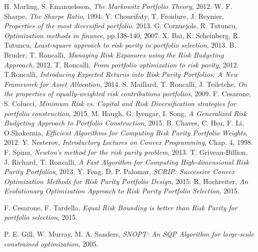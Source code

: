  H. Marling, S. Emanuelsson,
  \emph{The Markowitz Portfolio Theory},
  2012.
  W. F. Sharpe,
  \emph{The Sharpe Ratio},
  1994.
  Y. Choueifaty, T. Froidure, J. Reynier,
  \emph{Properties of the most diversified portfolio},
  2013. 
  G. Cornuejols, R. Tutuncu,
  \emph{Optimization methods in finance}, pp.138-140,
   2007.
  X. Bai, K. Scheinberg, R. Tutuncu,
  \emph{Least-square approach to risk parity in portfolio selection},
  2013.   
  B. Bruder, T. Roncalli,
  \emph{Managing Risk Exposures using the Risk Budgeting Approach},
  2012.   
  T. Roncalli,
  \emph{From portfolio optimization to risk parity},
  2012.
  T.Roncalli,
  \emph{Introducing Expected Returns into Risk Parity Portfolios: A New Framework for Asset Allocation},
  2014.   
  S. Maillard, T. Roncalli, J. Teiletche,
  \emph{On the properties of equally-weighted risk contributions portfolios},
  2009.
  F. Cesarone, S. Colucci,
  \emph{Minimum Risk vs. Capital and Risk Diversification strategies for portfolio construction},
  2015.  
  M. Haugh, G. Iyengar, I. Song, 
  \emph{A Generalized Risk Budgeting Approach to Portfolio Construction},
  2015.
  B. Chaves, C. Hsu, F. Li, O.Shakernia,
  \emph{Efficient Algorithms for Computing Risk Parity Portfolio Weights},
  2012.
  Y. Nesterov,
  \emph{Introductory Lectures on Convex Programming}, Chap. 4,
  1998.
  F. Spinu,
  \emph{Newton's method for the risk parity problem},
  2013.
  T. Griveau-Billion, J. Richard, T. Roncalli,
  \emph{A Fast Algorithm for Computing High-dimensional Risk Parity Portfolios},
  2013.
  Y. Feng, D. P. Palomar,
  \emph{SCRIP: Successive Convex Optimization Methods for Risk Parity Portfolio Design},
  2015.
   R. Hochreiter,
  \emph{An Evolutionary Optimization Approach to Risk Parity Portfolio Selection},
  2015.
  
  F. Cesarone, F. Tardella,		
  \emph{Equal Risk Bounding is better than Risk Parity for portfolio selection},
  2015.
  
	P. E. Gill, W. Murray, M. A. Sanders,
	\emph{SNOPT: An SQP Algorithm for large-scale constrained optimization}, 
	2005.